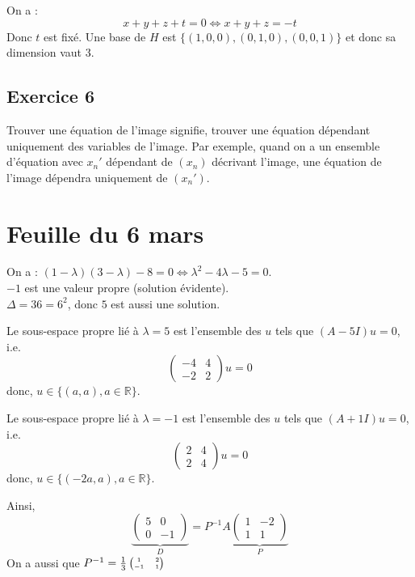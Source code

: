 \documentclass[a4paper, titlepage]{article}
\begin{document}
	On a :
	$$ x+y+z+t=0\iff x+y+z=-t $$
	Donc $t$ est fixé. Une base de $H$ est $\{(1,0,0),(0,1,0),(0,0,1)\}$ et donc sa dimension vaut 3.
	\subsection*{Exercice 6}
	Trouver une équation de l'image signifie, trouver une équation dépendant uniquement des variables de l'image. Par exemple, quand on a un ensemble d'équation avec $x_n'$ dépendant de $(x_n)$ décrivant l'image, une équation de l'image dépendra uniquement de $(x_n')$.
	\section{Feuille du 6 mars}
	On a : $(1-\lambda)(3-\lambda)-8 = 0 \iff \lambda^2-4\lambda-5 = 0$.\\
	$-1$ est une valeur propre (solution évidente).\\
	$\Delta = 36 = 6^2$, donc $5$ est aussi une solution.
	
	Le sous-espace propre lié à $\lambda = 5$ est l'ensemble des $u$ tels que $(A-5I)u = 0$, i.e.
	$$ \begin{pmatrix} -4&4\\-2&2 \end{pmatrix} u = 0 $$
	donc, $u\in\{(a,a),a\in\mathbb{R}\}$.
	
	Le sous-espace propre lié à $\lambda = -1$ est l'ensemble des $u$ tels que $(A+1I)u = 0$, i.e.
	$$ \begin{pmatrix} 2&4\\2&4 \end{pmatrix} u = 0 $$
	donc, $u\in\{(-2a,a),a\in\mathbb{R}\}$.

	Ainsi,
	$$ \underset{D}{\underbrace{\begin{pmatrix} 5&0\\0&-1 \end{pmatrix}}} = P^{-1}A\underset{P}{\underbrace{\begin{pmatrix} 1&-2\\1&1 \end{pmatrix}}} $$
	On a aussi que $P^{-1} = \frac{1}{3}\tiny\begin{pmatrix} 1&2\\-1&1 \end{pmatrix} $
\end{document}
